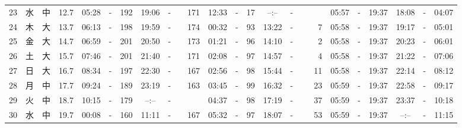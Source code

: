 \documentclass[12pt,a4j]{jsarticle}
\begin{document}
\begin{table}[htbp]
\begin{center}
{\begin{tabular}{|rc|cr|ccrccr|ccrccr|ccc|ccc|}
23 & 水 & 中 & 12.7 &  05:28 &-& 192 &  19:06 &-& 171 &  12:33 &-&  17 &  --:-- &-&~~~~~ & 05:57 & -& 19:37 & 18:08 & -& 04:07 \\
24 & 木 & 大 & 13.7 &  06:13 &-& 198 &  19:59 &-& 174 &  00:32 &-&  93 &  13:22 &-&   7 & 05:58 & -& 19:37 & 19:17 & -& 05:01 \\
25 & 金 & 大 & 14.7 &  06:59 &-& 201 &  20:50 &-& 173 &  01:21 &-&  96 &  14:10 &-&   2 & 05:58 & -& 19:37 & 20:23 & -& 06:01 \\
26 & 土 & 大 & 15.7 &  07:46 &-& 201 &  21:40 &-& 171 &  02:08 &-&  97 &  14:57 &-&   4 & 05:58 & -& 19:37 & 21:22 & -& 07:06 \\
27 & 日 & 大 & 16.7 &  08:34 &-& 197 &  22:30 &-& 167 &  02:56 &-&  98 &  15:44 &-&  11 & 05:58 & -& 19:37 & 22:14 & -& 08:12 \\
28 & 月 & 中 & 17.7 &  09:24 &-& 189 &  23:19 &-& 163 &  03:45 &-&  99 &  16:32 &-&  23 & 05:59 & -& 19:37 & 22:58 & -& 09:17 \\
29 & 火 & 中 & 18.7 &  10:15 &-& 179 &  --:-- &-&~~~~~ &  04:37 &-&  98 &  17:19 &-&  37 & 05:59 & -& 19:37 & 23:37 & -& 10:18 \\
30 & 水 & 中 & 19.7 &  00:08 &-& 160 &  11:11 &-& 167 &  05:32 &-&  97 &  18:07 &-&  53 & 05:59 & -& 19:37 & --:-- & -& 11:15 \\
   \hline
   \end{tabular}}
   \end{center}
\end{table}
\newpage
\end{document}
